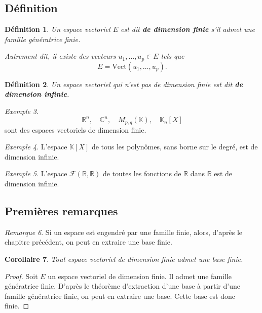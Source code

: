 \documentclass[11pt,a4paper]{article}
\newtheorem{definition}{Définition}[section]
\newtheorem{corollaire}[definition]{Corollaire}
\theoremstyle{remark}
\newtheorem{remarque}[definition]{Remarque}
\newtheorem{exemple}[definition]{Exemple}
\newcommand{\R}{\mathbb{R}}
\newcommand{\C}{\mathbb{C}}
\newcommand{\K}{\mathbb{K}}
\newcommand{\Vect}{\mathrm{Vect}}
\begin{document}
\subsection{Définition}

\begin{definition}
Un espace vectoriel \(E\) est dit \textbf{de dimension finie} s’il admet une famille génératrice finie.

Autrement dit, il existe des vecteurs \(u_1,\dots,u_p\in E\) tels que
\[
E=\Vect(u_1,\dots,u_p).
\]
\end{definition}

\begin{definition}
Un espace vectoriel qui n’est pas de dimension finie est dit \textbf{de dimension infinie}.
\end{definition}

\begin{exemple}
\[
\R^n,\quad \C^n,\quad M_{p,q}(\K),\quad \K_n[X]
\]
sont des espaces vectoriels de dimension finie.
\end{exemple}

\begin{exemple}
L’espace \(\K[X]\) de tous les polynômes, sans borne sur le degré, est de dimension infinie.
\end{exemple}

\begin{exemple}
L’espace \(\mathcal{F}(\R,\R)\) de toutes les fonctions de \(\R\) dans \(\R\) est de dimension infinie.
\end{exemple}

\subsection{Premières remarques}

\begin{remarque}
Si un espace est engendré par une famille finie, alors, d’après le chapitre précédent, on peut en extraire une base finie.
\end{remarque}

\begin{corollaire}
Tout espace vectoriel de dimension finie admet une base finie.
\end{corollaire}

\begin{proof}
Soit \(E\) un espace vectoriel de dimension finie. Il admet une famille génératrice finie. D’après le théorème d’extraction d’une base à partir d’une famille génératrice finie, on peut en extraire une base. Cette base est donc finie.
\end{proof}
\end{document}
